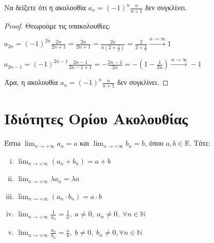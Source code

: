 \begin{example}
  Να δείξετε ότι η ακολουθία $ a_{n} = (-1)^{n}\frac{n}{n+1} $ δεν συγκλίνει. 
\end{example}

\begin{proof}
\item {}
  Θεωρούμε τις υπακολουθίες:
  \begin{myitemize}[labelindent=1em]
    \item $ a_{2n} = (-1)^{2n} \frac{2n}{2n+1} = \frac{2n}{2n+1} = \frac{2n}{n(2+
      \frac{1}{n})} = \frac{2}{2+ \frac{1}{n}} \xrightarrow{n \to \infty} 1 $
    \item $ a_{2n-1} = (-1)^{2n-1} \frac{2n-1}{2n-1+1} = -\frac{2n-1}{2n} = 
      -\left(1 - \frac{1}{2n}\right) \xrightarrow{n \to \infty} -1  $
  \end{myitemize}
  Άρα, η ακολουθία $ a_{n}= (-1)^{n} \frac{n}{n+1} $ δεν συγκλίνει.
\end{proof}



\section{Ιδιότητες Ορίου Ακολουθίας}

\begin{mybox3}
  \begin{prop}
    Έστω $ \lim_{n \to +\infty} a_{n} = a$ και $ \lim_{n \to +\infty} 
    b_{n} = b $, όπου $ a,b \in \mathbb{R} $. Τότε:
    \begin{enumerate}[i)]
      \item $ \lim_{n \to +\infty} (a_{n} + b_{n}) = a+b $
      \item $ \lim_{n \to +\infty} \lambda a_{n}= \lambda a $
      \item $ \lim_{n \to +\infty} (a_{n}\cdot b_{n}) = a\cdot b $
      \item $ \lim_{n \to +\infty} \frac{1}{a_{n}} = \frac{1}{a},
        \; a \neq 0, \; a_{n} \neq 0, \; \forall n \in \mathbb{N}  $
      \item $ \lim_{n \to +\infty} \frac{a_{n}}{b_{n}} = \frac{a}{b},
        \; b \neq 0, \; b_{n} \neq 0, \forall n \in \mathbb{N} $
    \end{enumerate}
  \end{prop}
\end{mybox3}

